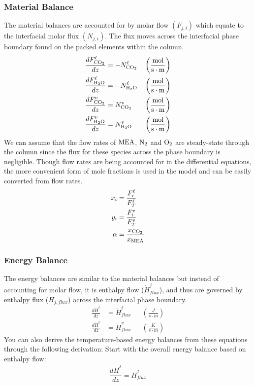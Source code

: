 \documentclass[a4paper,fleqn]{cas-sc}
\newcommand{\COtwo}{{\ce{CO2}}}
\newcommand{\HtwoO}{{\ce{H2O}}}
\newcommand{\MEA}{{\ce{MEA}}}
\newcommand{\Ntwo}{{\ce{N2}}}
\newcommand{\Otwo}{{\ce{O2}}}
\newcommand{\liq}{\ell}
\newcommand{\vap}{v}
\begin{document}
    \subsubsection{Material Balance}\label{subsubsec:material-balance}
    The material balances are accounted for by molar flow $\left(F_{j, i}\right)$ which equate to the interfacial molar flux $\left(N_{j,i}\right)$. The flux moves across the interfacial phase boundary found on the packed elements within the column.
    \begin{align}
        \frac{d F^{\liq}_{ \COtwo}}{d z} &= -N^{\liq}_{ \COtwo} && \left(\frac{\unit{mol}}{\unit{s\cdot m}} \right)\\
        \frac{d F^{\liq}_{ \HtwoO}}{d z} &= -N^{\liq}_{ \HtwoO} && \left(\frac{\unit{mol}}{\unit{s\cdot m}} \right)\\
        \frac{d F^{\vap}_{ \COtwo}}{d z} &= N^{\vap}_{ \COtwo} && \left(\frac{\unit{mol}}{\unit{s\cdot m}} \right)\\
        \frac{d F^{\vap}_{ \HtwoO}}{d z} &= N^{\vap}_{ \HtwoO} && \left(\frac{\unit{mol}}{\unit{s\cdot m}} \right)
    \end{align}
    We can assume that the flow rates of $\MEA$, $\Ntwo$ and $\Otwo$ are steady-state through the column since the flux for these species across the phase boundary is negligible. Though flow rates are being accounted for in the differential equations, the more convenient form of mole fractions is used in the model and can be easily converted from flow rates.
    \begin{align}
        x_i &= \frac{F^{\liq}_{ i}}{F^{\liq}_{ T}} \\
        y_i &= \frac{F^{\vap}_{ i}}{F^{\vap}_{ T}} \\
        \alpha &= \frac{x_{\COtwo}}{x_{\MEA}}
    \end{align}

    \subsubsection{Energy Balance}\label{subsubsec:energy-balance}
    The energy balances are similar to the material balances but instead of accounting for molar flow, it is enthalpy flow ($\dot{H}^{j}_{flux}$), and thus are governed by enthalpy flux ($\dot{H}_{j, flux}$) across the interfacial phase boundary.
    \begin{align}
        \frac{d \dot{H}^{\liq}}{d z} &= \dot{H}^{\liq}_{flux} && \left(\frac{\unit{J}}{\unit{s\cdot m}} \right)\\
        \frac{d \dot{H}^{\vap}}{d z} &= \dot{H}^{\vap}_{flux} && \left(\frac{\unit{K}}{\unit{s\cdot m}} \right)
    \end{align}
    You can also derive the temperature-based energy balances from these equations through the following derivation:
    Start with the overall energy balance based on enthalpy flow:
    \begin{equation}
        \frac{d\dot{H}^j}{dz} = \dot{H}^{j}_{flux}
    \end{equation}
\end{document}
